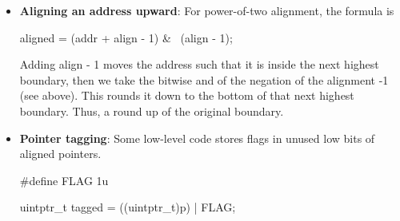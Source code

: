 \documentclass{report}
\begin{document}
\begin{itemize}
\begin{cppcode}
                \end{cppcode}
                \bigbreak \noindent 
                Checks if $a$ has remainder zero when divided by $A$. Now, consider
                \bigbreak \noindent 
                \begin{cppcode}
                ~(A-1) 
                \end{cppcode}
                \bigbreak \noindent 
                This is the number with all terms greater than or equal to $2^{\log_{2}{(A)}}$ non zero, and all terms less than $2^{\log_{2}{(A)}}$ zero. In essence, all bits left of  and including the $(\log_{2}{(A)}+1)$th one, and all bits to the right zero. For example, take $A = 16$, then 
                \begin{align*}
                    \sim(A - 1) = \sim(15) = 0b1111\ldots11110000
                .\end{align*}
                So, the bitwise and of a number $a$ with this mask turns off those bottom bits. Thus, it rounds $a$ down to the nearest boundary such that it is $A$ aligned.
            \item \textbf{Aligning an address upward}:  For power-of-two alignment, the formula is
                \bigbreak \noindent 
                \begin{cppcode}
                    aligned = (addr + align - 1) & ~(align - 1);
                \end{cppcode}
                \bigbreak \noindent 
                Adding align - 1 moves the address such that it is inside the next highest boundary, then we take the bitwise and of the negation of the alignment -1 (see above). This rounds it down to the bottom of that next highest boundary. Thus, a round up of the original boundary.
            \item \textbf{Pointer tagging}: Some low-level code stores flags in unused low bits of aligned pointers.
                \bigbreak \noindent 
                \begin{cppcode}
                    #define FLAG 1u

                    uintptr_t tagged = ((uintptr_t)p) | FLAG;


\end{cppcode}
\end{itemize}
\end{document}
